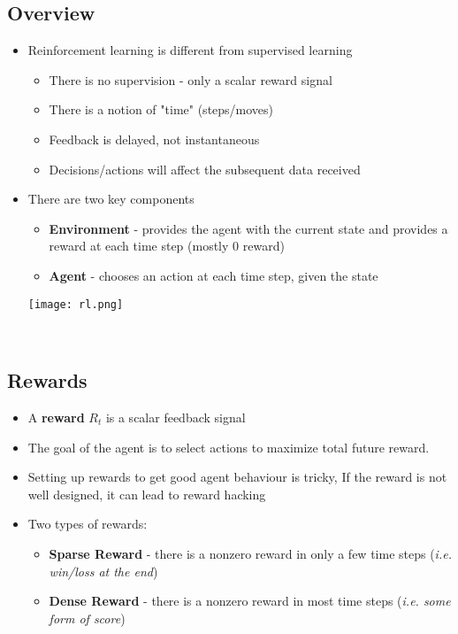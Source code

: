 \documentclass[11pt]{article}
\begin{document}
\subsection{Overview}
\begin{itemize}
\item Reinforcement learning is different from supervised learning
\begin{itemize}
\item There is no supervision - only a scalar reward signal 
\item There is a notion of "time" (steps/moves)
\item Feedback is delayed, not instantaneous 
\item Decisions/actions will affect the subsequent data received
\end{itemize}
\item There are two key components 
\begin{itemize}
\item \textbf{Environment} - provides the agent with the current state and provides a reward at each time step (mostly 0 reward)
\item \textbf{Agent} - chooses an action at each time step, given the state
\end{itemize} 
\begin{center}
\texttt{[image: rl.png]}
\end{center}\
\end{itemize}

\subsection{Rewards}
\begin{itemize}
\item A \textbf{reward} $R_t$ is a scalar feedback signal
\item The goal of the agent is to select actions to maximize total future reward.
\item Setting up rewards to get good agent behaviour is tricky, If the reward is not well designed, it can lead to reward hacking
\item Two types of rewards:
\begin{itemize}
\item \textbf{Sparse Reward} - there is a nonzero reward in only a few time steps (\textit{i.e. win/loss at the end})
\item \textbf{Dense Reward} - there is a nonzero reward in most time steps (\textit{i.e. some form of score})
\end{itemize}
\end{itemize}
\end{document}
